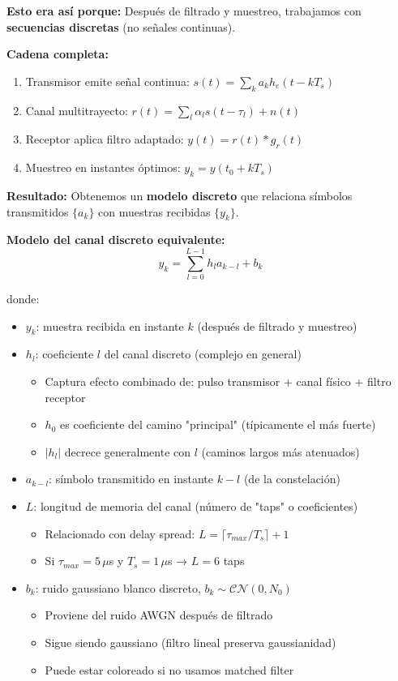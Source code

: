 \documentclass[10pt,a4paper]{article}
\begin{document}
\begin{tcolorbox}[colback=azulclaro!10,colframe=azuloscuro,title=🧠 FUNDAMENTO: ¿Por qué "discreto"?]
\textbf{Esto era así porque:} Después de filtrado y muestreo, trabajamos con \textbf{secuencias discretas} (no señales continuas).

\textbf{Cadena completa:}
\begin{enumerate}
\item Transmisor emite señal continua: $s(t) = \sum_k a_k h_e(t - kT_s)$
\item Canal multitrayecto: $r(t) = \sum_l \alpha_l s(t - \tau_l) + n(t)$
\item Receptor aplica filtro adaptado: $y(t) = r(t) * g_r(t)$
\item Muestreo en instantes óptimos: $y_k = y(t_0 + kT_s)$
\end{enumerate}

\textbf{Resultado:} Obtenemos un \textbf{modelo discreto} que relaciona símbolos transmitidos $\{a_k\}$ con muestras recibidas $\{y_k\}$.
\end{tcolorbox}

\textbf{Modelo del canal discreto equivalente:}
$$\boxed{y_k = \sum_{l=0}^{L-1} h_l a_{k-l} + b_k}$$

donde:
\begin{itemize}
\item $y_k$: muestra recibida en instante $k$ (después de filtrado y muestreo)
\item $h_l$: coeficiente $l$ del canal discreto (complejo en general)
  \begin{itemize}
  \item Captura efecto combinado de: pulso transmisor + canal físico + filtro receptor
  \item $h_0$ es coeficiente del camino "principal" (típicamente el más fuerte)
  \item $|h_l|$ decrece generalmente con $l$ (caminos largos más atenuados)
  \end{itemize}
\item $a_{k-l}$: símbolo transmitido en instante $k-l$ (de la constelación)
\item $L$: longitud de memoria del canal (número de "taps" o coeficientes)
  \begin{itemize}
  \item Relacionado con delay spread: $L = \lceil \tau_{max}/T_s \rceil + 1$
  \item Si $\tau_{max} = 5\,\mu$s y $T_s = 1\,\mu$s → $L = 6$ taps
  \end{itemize}
\item $b_k$: ruido gaussiano blanco discreto, $b_k \sim \mathcal{CN}(0, N_0)$
  \begin{itemize}
  \item Proviene del ruido AWGN después de filtrado
  \item Sigue siendo gaussiano (filtro lineal preserva gaussianidad)
  \item Puede estar coloreado si no usamos matched filter
  \end{itemize}
\end{itemize}
\end{document}
